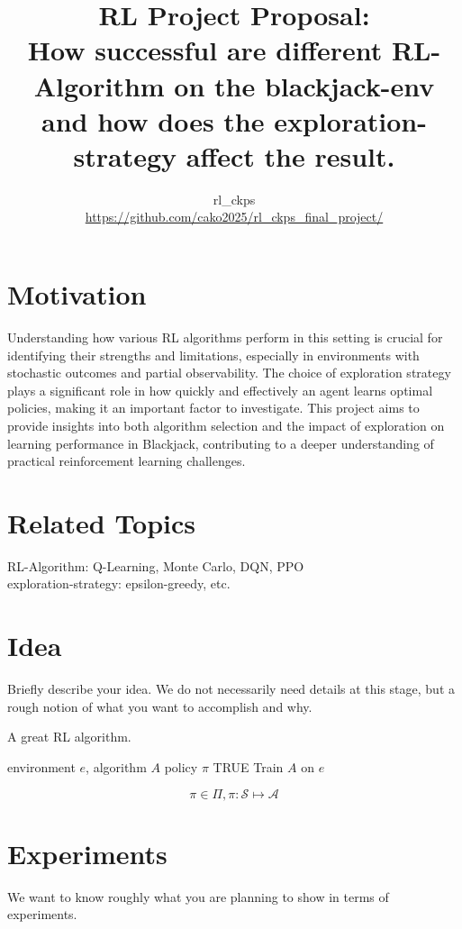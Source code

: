 \documentclass{article}
\title{{\large RL Project Proposal:}\\

How successful are different RL-Algorithm on the blackjack-env and how does the exploration-strategy affect the result.}
\author{rl\_ckps \\ \url{https://github.com/cako2025/rl_ckps_final_project/}}
\begin{document}
\maketitle
\section{Motivation}
Understanding how various RL algorithms perform in this setting is crucial for identifying their strengths and limitations, especially in environments with stochastic outcomes and partial observability. The choice of exploration strategy plays a significant role in how quickly and effectively an agent learns optimal policies, making it an important factor to investigate. This project aims to provide insights into both algorithm selection and the impact of exploration on learning performance in Blackjack, contributing to a deeper understanding of practical reinforcement learning challenges.

\section{Related Topics}
RL-Algorithm: Q-Learning, Monte Carlo, DQN, PPO\\
exploration-strategy: epsilon-greedy, etc.

\section{Idea}
Briefly describe your idea. We do not necessarily need details at this stage, but a rough notion of what you want to accomplish and why.

\begin{algorithm}[H]
    \caption{A great RL algorithm.}
    \label{alg:code}
    \begin{algorithmic}
        \Require environment $e$, algorithm $A$
        \Return policy $\pi$
        \While TRUE
            \State Train $A$ on $e$
        \EndWhile
    \end{algorithmic}
\end{algorithm}

\begin{equation}
    \label{eq:pi}
    \pi \in \Pi, \pi: \mathcal{S} \mapsto \mathcal{A}
\end{equation}

\section{Experiments}
We want to know roughly what you are planning to show in terms of experiments. 
\end{document}
